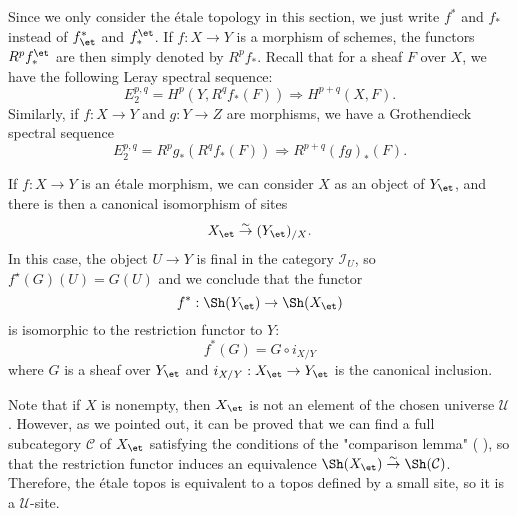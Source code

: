 Since we only consider the \'etale topology in this section, we just write $f^*$ and $f_*$ instead of $f^*_\et$ and $f_*^\et$. If $f:X\to Y$ is a morphism of schemes, the functors $R^pf_*^\et$ are then simply denoted by $R^pf_*$. Recall that for a sheaf $F$ over $X$, we have the following Leray spectral sequence:
\[E_2^{p,q}=H^p(Y,R^qf_*(F))\Rightarrow H^{p+q}(X,F).\]
Similarly, if $f:X\to Y$ and $g:Y\to Z$ are morphisms, we have a Grothendieck spectral sequence
\[E_2^{p,q}=R^pg_*(R^qf_*(F))\Rightarrow R^{p+q}(fg)_*(F).\]

If $f:X\to Y$ is an \'etale morphism, we can consider $X$ as an object of $Y_\et$, and there is then a canonical isomorphism of sites
\[X_\et\stackrel{\sim}{\to}(Y_\et)_{/X}.\]
In this case, the object $U\to Y$ is final in the category $\mathcal{I}_U$, so $f^\star(G)(U)=G(U)$ and we conclude that the functor
\[f^*:\Sh(Y_\et)\to\Sh(X_\et)\]
is isomorphic to the restriction functor to $Y$:
\begin{equation}\label{scheme etale morphism induced on topos-4}
f^*(G)=G\circ i_{X/Y}
\end{equation}
where $G$ is a sheaf over $Y_\et$ and $i_{X/Y}:X_\et\to Y_\et$ is the canonical inclusion.

\begin{remark}
Note that if $X$ is nonempty, then $X_\et$ is not an element of the chosen universe $\mathscr{U}$. However, as we pointed out, it can be proved that we can find a full subcategory $\mathcal{C}$ of $X_\et$ satisfying the conditions of the "comparison lemma" (\cite{SGA4-1} ), so that the restriction functor induces an equivalence $\Sh(X_\et)\stackrel{\sim}{\to}\Sh(\mathcal{C})$. Therefore, the \'etale topos is equivalent to a topos defined by a small site, so it is a $\mathscr{U}$-site.
\end{remark}


